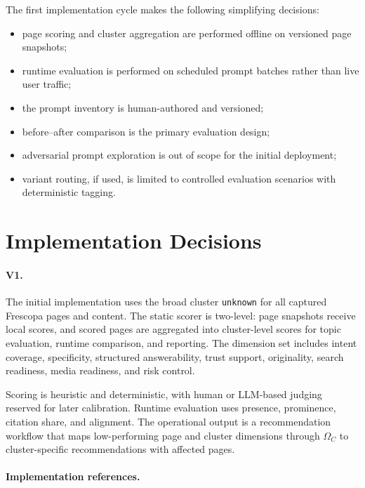\documentclass{article}
\begin{document}
The first implementation cycle makes the following simplifying decisions:
\begin{itemize}
    \item page scoring and cluster aggregation are performed offline on versioned page snapshots;
    \item runtime evaluation is performed on scheduled prompt batches rather than live user traffic;
    \item the prompt inventory is human-authored and versioned;
    \item before--after comparison is the primary evaluation design;
    \item adversarial prompt exploration is out of scope for the initial deployment;
    \item variant routing, if used, is limited to controlled evaluation scenarios with deterministic tagging.
\end{itemize}

\section{Implementation Decisions}

\paragraph{V1.}

The initial implementation uses the broad cluster \texttt{unknown} for all captured Frescopa pages and content. The static scorer is two-level: page snapshots receive local scores, and scored pages are aggregated into cluster-level scores for topic evaluation, runtime comparison, and reporting. The dimension set includes intent coverage, specificity, structured answerability, trust support, originality, search readiness, media readiness, and risk control.

Scoring is heuristic and deterministic, with human or LLM-based judging reserved for later calibration. Runtime evaluation uses presence, prominence, citation share, and alignment. The operational output is a recommendation workflow that maps low-performing page and cluster dimensions through \(\Omega_C\) to cluster-specific recommendations with affected pages.

\paragraph{Implementation references.}
\end{document}
